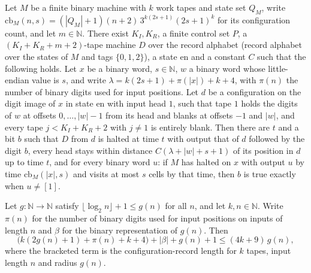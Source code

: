 \begin{lemma}
\label{Complexity.sph_record_suffix}
\leanok
{}
Let $M$ be a finite binary machine with $k$ work tapes and state set $Q_M$, write
$\mathrm{cb}_M(n,s)=(|Q_M|+1)(n+2)\,3^{k(2s+1)}(2s+1)^{k}$ for its configuration count, and let $m\in\mathbb{N}$. There exist $K_I,K_R$, a
finite control set $P$, a $(K_I+K_R+m+2)$-tape machine $D$ over the record alphabet (record alphabet over the states of $M$ and tags $\{0,1,2\}$),
a state $\mathrm{en}$ and a constant $C$ such that the following holds. Let $x$ be a binary word,
$s\in\mathbb{N}$, $w$ a binary word whose little-endian value is $s$, and write $\lambda=k(2s+1)+\pi(|x|)+k+4$, with $\pi(n)$ the number of binary digits used for input positions.
Let $d$ be a configuration on the digit image of $x$ in state $\mathrm{en}$ with input head $1$, such
that tape $1$ holds the digits of $w$ at offsets $0,\dots,|w|-1$ from its head and blanks at
offsets $-1$ and $|w|$, and every tape $j<K_I+K_R+2$ with $j\ne1$ is entirely blank. Then there are
$t$ and a bit $b$ such that $D$ from $d$ is halted at time $t$ with output that of $d$ followed by
the digit $b$, every head stays within distance $C(\lambda+|w|+s+1)$ of its position in $d$ up to
time $t$, and for every binary word $u$: if $M$ has halted on $x$ with output $u$ by time
$\mathrm{cb}_M(|x|,s)$ and visits at most $s$ cells by that time, then $b$ is true exactly when
$u\ne[1]$.
\end{lemma}

\begin{lemma}
\label{Complexity.sph_record_size}
\leanok
{}
Let $g:\mathbb{N}\to\mathbb{N}$ satisfy $\lfloor\log_2 n\rfloor+1\le g(n)$ for all $n$, and let
$k,n\in\mathbb{N}$. Write $\pi(n)$ for the number of binary digits used for input positions on
inputs of length $n$ and $\beta$ for the binary representation of $g(n)$. Then
\[ \bigl(k(2g(n)+1)+\pi(n)+k+4\bigr)+|\beta|+g(n)+1\le(4k+9)\,g(n), \]
where the bracketed term is the configuration-record length for $k$ tapes, input length $n$ and
radius $g(n)$.
\end{lemma}

